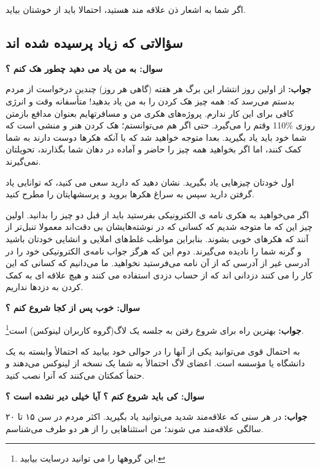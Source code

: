 اگر شما به اشعار ذن علاقه مند هستید، احتمالا باید از
خوشتان بیاید.
\subsection*{سؤالاتی که زیاد پرسیده شده اند}
\textbf{سوال:  به من یاد می دهید چطور هک کنم ؟}

\textbf{جواب:} از اولین روز انتشار این برگ هر هفته (گاهی هر روز) چندین درخواست از مردم بدستم می‌رسد که: همه چیز هک کردن را به من یاد بدهید! متأسفانه وقت و انرژی کافی برای این کار ندارم. پروژه‌های هکری من و مسافرتهایم بعنوان مدافع بازمتن روزی
\%110
وقتم را می‌گیرد.
حتی اگر هم می‌توانستم؛ هک کردن هنر و منشی است که شما خود باید یاد بگیرید. بعدا متوجه خواهید شد که با آنکه هکرها دوست دارند به شما کمک کنند، اما اگر بخواهید همه چیز را حاضر و آماده در دهان شما بگذارند، تحویلتان نمی‌گیرند.

اول خودتان چیزهایی یاد بگیرید. نشان دهید که دارید سعی می کنید، که توانایی یاد گرفتن دارید سپس به سراغ هکرها بروید و پرسشهایتان را مطرح کنید.

اگر می‌خواهید به هکری نامه ی الکترونیکی بفرستید باید از قبل دو چیز را بدانید. اولین چیز این که ما متوجه شدیم که کسانی که در نوشته‌هایشان بی دقت‌اند معمولا تنبل‌تر از آنند که هکرهای خوبی بشوند. بنابراین مواظب غلط‌های املایی و انشایی خودتان باشید و گرنه شما را نادیده می‌گیرند. دوم این که هرگز جواب نامه‌ی الکترونیکی خود را در آدرسی غیر از آدرسی که از آن نامه می‌فرستید نخواهید. ما می‌دانیم که کسانی که این کار را می کنند دزدانی اند که از حساب دزدی استفاده می کنند و هیچ علاقه ای به کمک کردن به دزدها نداریم.

\textbf{سوال:  خوب پس از کجا شروع کنم ؟}

\textbf{جواب:}
 بهترین راه برای شروع رفتن به جلسه یک لاگ(گروه کاربران لینوکس) است\footnote{این گروهها را می توانید درسایت \href{http://www.tldp.org/links/index.html}{} بیابید. }.

به احتمال قوی می‌توانید یکی از آنها را در حوالی خود بیابید که احتمالأ وابسته به یک دانشگاه یا مؤسسه است. اعضای لاگ احتمالأ به شما یک نسخه از لینوکس می‌دهند و حتمأ کمکتان می‌کنند که آنرا نصب کنید.

\textbf{سوال:  کی باید شروع کنم ؟ آیا خیلی دیر نشده است ؟}

\textbf{جواب:} 
در هر سنی که علاقه‌مند شدید می‌توانید یاد بگیرید. اکثر مردم در سن ۱۵ تا ۲۰ سالگی علاقه‌مند می شوند؛ من استثناهایی را از هر دو طرف می‌شناسم.

